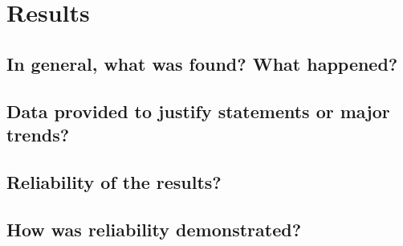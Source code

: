 \documentclass[12pt,oneside,letterpaper]{article}
\begin{document}
\section{Results}

\subsection{In general, what was found? What happened?}

\subsection{Data provided to justify statements or major trends?}

\subsection{Reliability of the results?}

\subsection{How was reliability demonstrated?}
\end{document}
